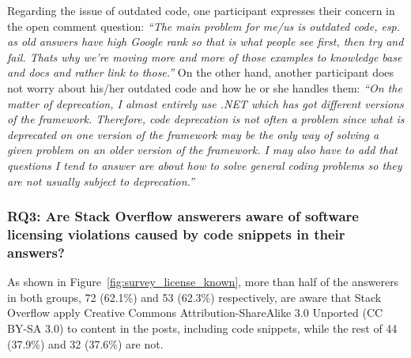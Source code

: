 \documentclass{svjour3}                     %
\begin{document}
Regarding the issue of outdated code, one participant expresses their concern
in the open comment question: \textit{``The main problem for me/us is outdated
	code, esp. as old answers have high Google rank so that is what people see
	first, then try and fail. Thats why we're moving more and more of those examples
	to knowledge base and docs and rather link to those.''} On the other hand,
another participant does not  worry about his/her outdated code and how he
or she handles them: \textit{``On
	the matter of deprecation, I almost entirely use .NET which has got different
	versions of the framework. Therefore, code deprecation is not often a problem
	since what is deprecated on one version of the framework may be the only way of
	solving a given problem on an older version of the framework. I may also have to
	add that questions I tend to answer are about how to solve general coding
	problems so they are not usually subject to deprecation.''}

\vspace{0.5cm} \noindent{}
\vspace{0.5cm}

\subsubsection*{RQ3: Are Stack Overflow answerers aware of software licensing
	violations caused by code snippets in their answers?}

As shown in Figure~\ref{fig:survey_license_known}, more than half of the
answerers in both groups, 72 (62.1\%) and 53 (62.3\%) respectively, are aware that Stack
Overflow apply Creative Commons Attribution-ShareAlike 3.0 Unported (CC BY-SA
3.0) to content in the posts, including code snippets, while the rest of 44 (37.9\%)
and 32 (37.6\%) are not. 
\end{document}
